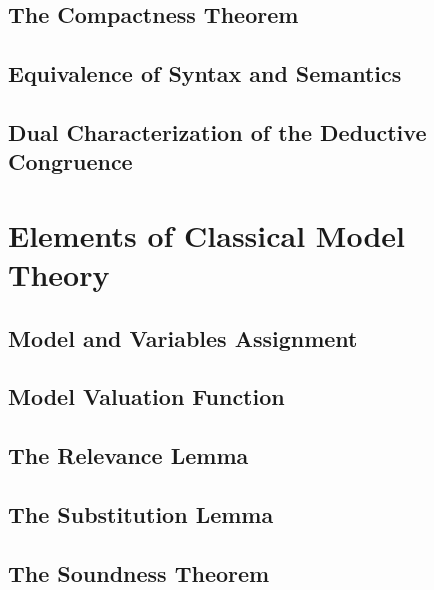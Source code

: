 \documentclass{report}
\begin{document}
    \subsection{The Compactness Theorem}
      
    \subsection{Equivalence of Syntax and Semantics}
      
    \subsection{Dual Characterization of the Deductive Congruence}
      
\section{Elements of Classical Model Theory}
    \subsection{Model and Variables Assignment}
      
    \subsection{Model Valuation Function}
      
    \subsection{The Relevance Lemma}
      
    \subsection{The Substitution Lemma}
      
    \subsection{The Soundness Theorem}
      
\end{document}
